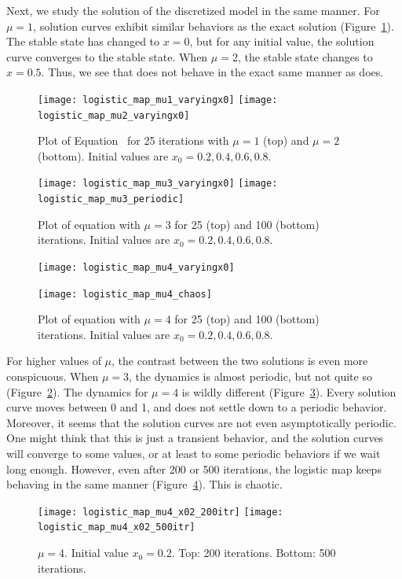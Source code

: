 \documentclass[10pt,twoside,draft]{book}
\begin{document}
Next, we study the solution of the discretized model  in the same manner.
For $\mu = 1$, solution curves exhibit similar behaviors as the exact solution (Figure~\ref{fig:logistic1-2}).
The stable state has changed to $x = 0$, but for any initial value, the solution curve converges to the stable state.
When $\mu = 2$, the stable state changes to $x = 0.5$.
Thus, we see that  does not behave in the exact same manner as  does.
\begin{figure}[p]
    \centering
    \texttt{[image: logistic\_map\_mu1\_varyingx0]}
    \texttt{[image: logistic\_map\_mu2\_varyingx0]}
    \caption{
      Plot of Equation~ for 25 iterations with $\mu = 1$ (top) and $\mu = 2$ (bottom).
      Initial values are $x_0 = 0.2, 0.4, 0.6, 0.8$.
    }
    \label{fig:logistic1-2}
\end{figure}
\begin{figure}[p]
    \centering
    \texttt{[image: logistic\_map\_mu3\_varyingx0]}
    \texttt{[image: logistic\_map\_mu3\_periodic]}
    \caption{
      Plot of equation  with $\mu = 3$ for 25 (top) and 100 (bottom) iterations.
      Initial values are $x_0 = 0.2, 0.4, 0.6, 0.8$.
    }
    \label{fig:logistic3}
\end{figure}
\begin{figure}[p]
  \centering
  \texttt{[image: logistic\_map\_mu4\_varyingx0]}

  \texttt{[image: logistic\_map\_mu4\_chaos]}
  \caption{
    Plot of equation  with $\mu = 4$ for 25 (top) and 100 (bottom) iterations.
    Initial values are $x_0 = 0.2, 0.4, 0.6, 0.8$.
  }
  \label{fig:logistic4}
\end{figure}
For higher values of $\mu$, the contrast between the two solutions is even more conspicuous.
When $\mu = 3$, the dynamics is almost periodic, but not quite so (Figure~\ref{fig:logistic3}).
The dynamics for $\mu = 4$ is wildly different (Figure~\ref{fig:logistic4}).
Every solution curve moves between 0 and 1, and does not settle down to a periodic behavior.
Moreover, it seems that the solution curves are not even asymptotically periodic.
One might think that this is just a transient behavior, and the solution curves will converge to some values, or at least to some periodic behaviors if we wait long enough.
However, even after 200 or 500 iterations, the logistic map keeps behaving in the same manner (Figure~\ref{fig:chaotic_map}).
This is chaotic.
\begin{figure}[p]
  \centering
  \texttt{[image: logistic\_map\_mu4\_x02\_200itr]}
  \texttt{[image: logistic\_map\_mu4\_x02\_500itr]}
  \caption{
    $\mu = 4$. Initial value $x_0 = 0.2$.
    Top: 200 iterations. Bottom: 500 iterations.
  }
  \label{fig:chaotic_map}
\end{figure}
\end{document}
